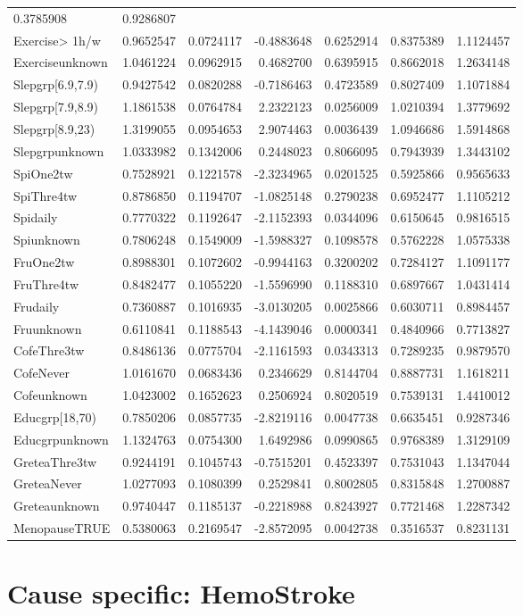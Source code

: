 \documentclass[]{article}
\begin{document}
\begin{longtable}[]{@{}lrrrrrr@{}}
0.3785908 & 0.9286807\tabularnewline
Exercise\textgreater{} 1h/w & 0.9652547 & 0.0724117 & -0.4883648 &
0.6252914 & 0.8375389 & 1.1124457\tabularnewline
Exerciseunknown & 1.0461224 & 0.0962915 & 0.4682700 & 0.6395915 &
0.8662018 & 1.2634148\tabularnewline
Slepgrp{[}6.9,7.9) & 0.9427542 & 0.0820288 & -0.7186463 & 0.4723589 &
0.8027409 & 1.1071884\tabularnewline
Slepgrp{[}7.9,8.9) & 1.1861538 & 0.0764784 & 2.2322123 & 0.0256009 &
1.0210394 & 1.3779692\tabularnewline
Slepgrp{[}8.9,23) & 1.3199055 & 0.0954653 & 2.9074463 & 0.0036439 &
1.0946686 & 1.5914868\tabularnewline
Slepgrpunknown & 1.0333982 & 0.1342006 & 0.2448023 & 0.8066095 &
0.7943939 & 1.3443102\tabularnewline
SpiOne2tw & 0.7528921 & 0.1221578 & -2.3234965 & 0.0201525 & 0.5925866 &
0.9565633\tabularnewline
SpiThre4tw & 0.8786850 & 0.1194707 & -1.0825148 & 0.2790238 & 0.6952477
& 1.1105212\tabularnewline
Spidaily & 0.7770322 & 0.1192647 & -2.1152393 & 0.0344096 & 0.6150645 &
0.9816515\tabularnewline
Spiunknown & 0.7806248 & 0.1549009 & -1.5988327 & 0.1098578 & 0.5762228
& 1.0575338\tabularnewline
FruOne2tw & 0.8988301 & 0.1072602 & -0.9944163 & 0.3200202 & 0.7284127 &
1.1091177\tabularnewline
FruThre4tw & 0.8482477 & 0.1055220 & -1.5596990 & 0.1188310 & 0.6897667
& 1.0431414\tabularnewline
Frudaily & 0.7360887 & 0.1016935 & -3.0130205 & 0.0025866 & 0.6030711 &
0.8984457\tabularnewline
Fruunknown & 0.6110841 & 0.1188543 & -4.1439046 & 0.0000341 & 0.4840966
& 0.7713827\tabularnewline
CofeThre3tw & 0.8486136 & 0.0775704 & -2.1161593 & 0.0343313 & 0.7289235
& 0.9879570\tabularnewline
CofeNever & 1.0161670 & 0.0683436 & 0.2346629 & 0.8144704 & 0.8887731 &
1.1618211\tabularnewline
Cofeunknown & 1.0423002 & 0.1652623 & 0.2506924 & 0.8020519 & 0.7539131
& 1.4410012\tabularnewline
Educgrp{[}18,70) & 0.7850206 & 0.0857735 & -2.8219116 & 0.0047738 &
0.6635451 & 0.9287346\tabularnewline
Educgrpunknown & 1.1324763 & 0.0754300 & 1.6492986 & 0.0990865 &
0.9768389 & 1.3129109\tabularnewline
GreteaThre3tw & 0.9244191 & 0.1045743 & -0.7515201 & 0.4523397 &
0.7531043 & 1.1347044\tabularnewline
GreteaNever & 1.0277093 & 0.1080399 & 0.2529841 & 0.8002805 & 0.8315848
& 1.2700887\tabularnewline
Greteaunknown & 0.9740447 & 0.1185137 & -0.2218988 & 0.8243927 &
0.7721468 & 1.2287342\tabularnewline
MenopauseTRUE & 0.5380063 & 0.2169547 & -2.8572095 & 0.0042738 &
0.3516537 & 0.8231131\tabularnewline
\bottomrule
\end{longtable}

\hypertarget{cause-specific-hemostroke}{%
\section{Cause specific: HemoStroke}\label{cause-specific-hemostroke}}
\end{document}
